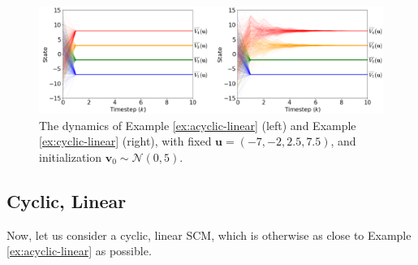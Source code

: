 \documentclass[12pt]{article}
\begin{document}
\begin{figure}
\centering
\includegraphics[width=\linewidth]{pics/my_own/example_dynamics.png}
\caption{The dynamics of Example \ref{ex:acyclic-linear} (left) and Example \ref{ex:cyclic-linear} (right), with fixed $\mathbf{u}=(-7,-2,2.5,7.5)$, and initialization $\mathbf{v}_0\sim\mathcal{N}(0,5)$.}
\label{fig:dynamics}
\end{figure}

\subsection{Cyclic, Linear}

Now, let us consider a cyclic, linear SCM, which is otherwise as close to Example \ref{ex:acyclic-linear} as possible.
\end{document}
